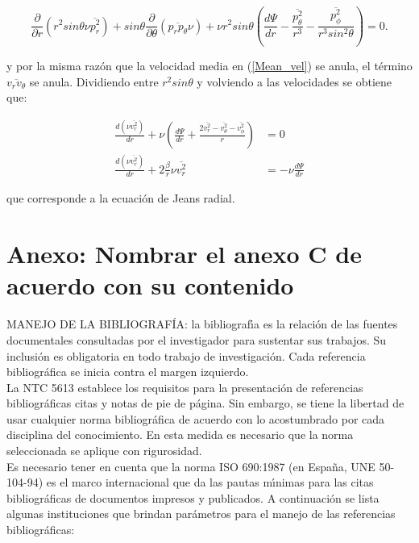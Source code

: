 \begin{appendix}
\begin{equation}
\frac{\partial }{\partial r} (r^2 sin \theta \nu \overline{p_r^2}) + sin \theta \frac{\partial }{\partial \theta} (\overline{p_r p_\theta } \nu) + \nu r^2 sin \theta \left ( \frac{d \Psi}{d r} - \frac{ \overline{p_\theta^2} }{r^3} - \frac{ \overline{p_\phi^2} }{r^3 sin^2\theta} \right ) = 0.
\end{equation}

y por la misma razón que la velocidad media en (\ref{Mean_vel}) se anula, el término $\overline{v_r v_\theta}$ se anula. Dividiendo entre $r^2 sin \theta$ y volviendo a las velocidades se obtiene que:

\begin{align}
\frac{d (\nu \overline{v_r^2})}{dr} + \nu \left ( \frac{d \Psi}{d r} + \frac{2 \overline{v_r^2}-\overline{v_\theta^2}-\overline{v_\phi^2}}{r} \right ) & = 0 \\
\frac{d (\nu \overline{v_r^2})}{dr}  + 2 \frac{\beta}{r} \nu \overline{v_r^2} & = - \nu \frac{d \Psi}{d r}
\end{align}

que corresponde a la ecuación de Jeans radial.



\chapter{Anexo: Nombrar el anexo C de acuerdo con su contenido}
MANEJO DE LA BIBLIOGRAF\'{I}A: la bibliograf\'{\i}a es la relaci\'{o}n de las fuentes documentales consultadas por el investigador para sustentar sus trabajos. Su inclusi\'{o}n es obligatoria en todo trabajo de investigaci\'{o}n. Cada referencia bibliogr\'{a}fica se inicia contra el margen izquierdo.\\

La NTC 5613 establece los requisitos para la presentaci\'{o}n de referencias bibliogr\'{a}ficas citas y notas de pie de p\'{a}gina. Sin embargo, se tiene la libertad de usar cualquier norma bibliogr\'{a}fica de acuerdo con lo acostumbrado por cada disciplina del conocimiento. En esta medida es necesario que la norma seleccionada se aplique con rigurosidad.\\

Es necesario tener en cuenta que la norma ISO 690:1987 (en Espa\~{n}a, UNE 50-104-94) es el marco internacional que da las pautas m\'{\i}nimas para las citas bibliogr\'{a}ficas de documentos impresos y publicados. A continuaci\'{o}n se lista algunas instituciones que brindan par\'{a}metros para el manejo de las referencias bibliogr\'{a}ficas:\\


\end{appendix}
